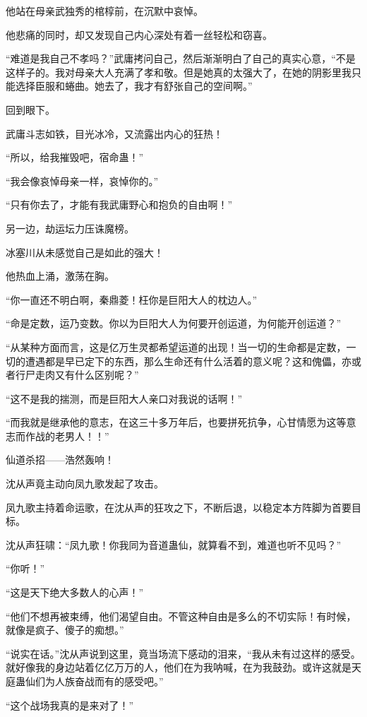 \begin{this_body}
他站在母亲武独秀的棺椁前，在沉默中哀悼。

他悲痛的同时，却又发现自己内心深处有着一丝轻松和窃喜。

“难道是我自己不孝吗？”武庸拷问自己，然后渐渐明白了自己的真实心意，“不是这样子的。我对母亲大人充满了孝和敬。但是她真的太强大了，在她的阴影里我只能选择臣服和蜷曲。她去了，我才有舒张自己的空间啊。”

回到眼下。

武庸斗志如铁，目光冰冷，又流露出内心的狂热！

“所以，给我摧毁吧，宿命蛊！”

“我会像哀悼母亲一样，哀悼你的。”

“只有你去了，才能有我武庸野心和抱负的自由啊！”

另一边，劫运坛力压诛魔榜。

冰塞川从未感觉自己是如此的强大！

他热血上涌，激荡在胸。

“你一直还不明白啊，秦鼎菱！枉你是巨阳大人的枕边人。”

“命是定数，运乃变数。你以为巨阳大人为何要开创运道，为何能开创运道？”

“从某种方面而言，这是亿万生灵都希望运道的出现！当一切的生命都是定数，一切的遭遇都是早已定下的东西，那么生命还有什么活着的意义呢？这和傀儡，亦或者行尸走肉又有什么区别呢？”

“这不是我的揣测，而是巨阳大人亲口对我说的话啊！”

“而我就是继承他的意志，在这三十多万年后，也要拼死抗争，心甘情愿为这等意志而作战的老男人！！”

仙道杀招——浩然轰响！

沈从声竟主动向凤九歌发起了攻击。

凤九歌主持着命运歌，在沈从声的狂攻之下，不断后退，以稳定本方阵脚为首要目标。

沈从声狂啸：“凤九歌！你我同为音道蛊仙，就算看不到，难道也听不见吗？”

“你听！”

“这是天下绝大多数人的心声！”

“他们不想再被束缚，他们渴望自由。不管这种自由是多么的不切实际！有时候，就像是疯子、傻子的痴想。”

“说实在话。”沈从声说到这里，竟当场流下感动的泪来，“我从未有过这样的感受。就好像我的身边站着亿亿万万的人，他们在为我呐喊，在为我鼓劲。或许这就是天庭蛊仙们为人族奋战而有的感受吧。”

“这个战场我真的是来对了！”


\end{this_body}
